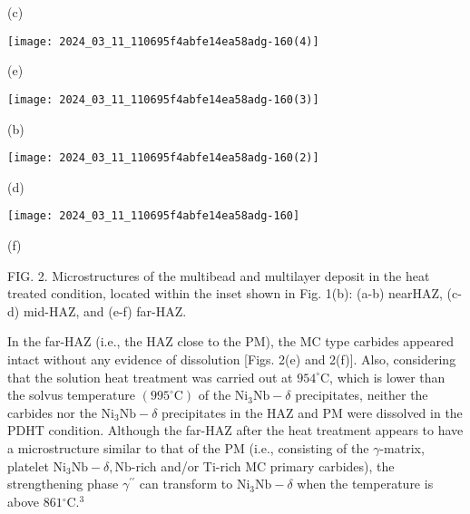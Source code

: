 \documentclass[10pt]{article}
\begin{document}
(c)

\begin{center}
\texttt{[image: 2024\_03\_11\_110695f4abfe14ea58adg-160(4)]}
\end{center}

(e)

\begin{center}
\texttt{[image: 2024\_03\_11\_110695f4abfe14ea58adg-160(3)]}
\end{center}

(b)

\begin{center}
\texttt{[image: 2024\_03\_11\_110695f4abfe14ea58adg-160(2)]}
\end{center}

(d)

\begin{center}
\texttt{[image: 2024\_03\_11\_110695f4abfe14ea58adg-160]}
\end{center}

(f)

FIG. 2. Microstructures of the multibead and multilayer deposit in the heat treated condition, located within the inset shown in Fig. 1(b): (a-b) nearHAZ, (c-d) mid-HAZ, and (e-f) far-HAZ.

In the far-HAZ (i.e., the HAZ close to the PM), the MC type carbides appeared intact without any evidence of dissolution [Figs. 2(e) and 2(f)]. Also, considering that the solution heat treatment was carried out at $954^{\circ} \mathrm{C}$, which is lower than the solvus temperature $\left(995^{\circ} \mathrm{C}\right)$ of the $\mathrm{Ni}_{3} \mathrm{Nb}-\delta$ precipitates, neither the carbides nor the $\mathrm{Ni}_{3} \mathrm{Nb}-\delta$ precipitates in the HAZ and PM were dissolved in the PDHT condition. Although the far-HAZ after the heat treatment appears to have a microstructure similar to that of the PM (i.e., consisting of the $\gamma$-matrix, platelet $\mathrm{Ni}_{3} \mathrm{Nb}-\delta, \mathrm{Nb}$-rich and/or Ti-rich MC primary carbides), the strengthening phase $\gamma^{\prime \prime}$ can transform to $\mathrm{Ni}_{3} \mathrm{Nb}-\delta$ when the temperature is above $861{ }^{\circ} \mathrm{C} .{ }^{3}$
\end{document}
